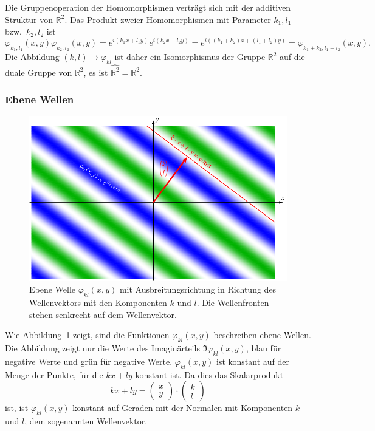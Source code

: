 Die Gruppenoperation der Homomorphismen verträgt sich mit der additiven
Struktur von $\mathbb{R}^2$.
Das Produkt zweier Homomorphismen mit Parameter $k_1,l_1$ bzw.~$k_2,l_2$
ist
\[
\varphi_{k_1,l_1}(x,y)
\varphi_{k_2,l_2}(x,y)
=
e^{i(k_1x+l_1y)}
e^{i(k_2x+l_2y)}
=
e^{i((k_1+k_2)x+(l_1+l_2)y)}
=
\varphi_{k_1+k_2,l_1+l_2}(x,y).
\]
Die Abbildung $(k,l)\mapsto \varphi_{kl}$ ist daher ein Isomorphismus
der Gruppe $\mathbb{R}^2$ auf die duale Gruppe von $\mathbb{R}^2$,
es ist $\widehat{\mathbb{R}^2} = \mathbb{R}^2$.

%
%
\subsubsection{Ebene Wellen}
\begin{figure}
\centering
\includegraphics{chapters/050-radon/images/ebenewellen.pdf}
\caption{Ebene Welle $\varphi_{kl}(x,y)$ mit Ausbreitungsrichtung
in Richtung des Wellenvektors mit den Komponenten $k$ und $l$.
Die Wellenfronten stehen senkrecht auf dem Wellenvektor.
\label{buch:radon:fig:ebenewelle}}
\end{figure}
Wie Abbildung~\ref{buch:radon:fig:ebenewelle} zeigt, sind
die Funktionen $\varphi_{kl}(x,y)$ beschreiben ebene Wellen.
Die Abbildung zeigt nur die Werte des Imaginärteils $\Im \varphi_{kl}(x,y)$,
blau für negative Werte und grün für negative Werte.
$\varphi_{kl}(x,y)$ ist konstant auf der Menge der Punkte, für die
$kx+ly$ konstant ist.
Da dies das Skalarprodukt 
\[
kx+ly 
=
\begin{pmatrix}x\\y\end{pmatrix}
\cdot
\begin{pmatrix}k\\l\end{pmatrix}
\]
ist, ist $\varphi_{kl}(x,y)$ konstant auf Geraden mit der Normalen
mit Komponenten $k$ und $l$, dem sogenannten Wellenvektor.

